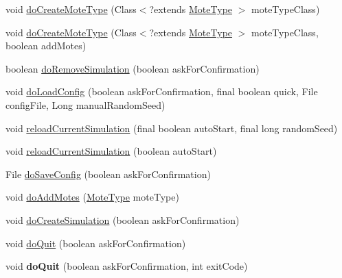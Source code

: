 \begin{DoxyCompactItemize}
\item 
void \hyperlink{classorg_1_1contikios_1_1cooja_1_1Cooja_ad4852cfd6527e8e6abeb411f80032670}{do\-Create\-Mote\-Type} (Class$<$?extends \hyperlink{interfaceorg_1_1contikios_1_1cooja_1_1MoteType}{Mote\-Type} $>$ mote\-Type\-Class)
\item 
void \hyperlink{classorg_1_1contikios_1_1cooja_1_1Cooja_a1b9fc81beb44e643bed511a3bee541dd}{do\-Create\-Mote\-Type} (Class$<$?extends \hyperlink{interfaceorg_1_1contikios_1_1cooja_1_1MoteType}{Mote\-Type} $>$ mote\-Type\-Class, boolean add\-Motes)
\item 
boolean \hyperlink{classorg_1_1contikios_1_1cooja_1_1Cooja_a0b4e1f7e5a943baf9db5da0ccdca0493}{do\-Remove\-Simulation} (boolean ask\-For\-Confirmation)
\item 
void \hyperlink{classorg_1_1contikios_1_1cooja_1_1Cooja_a767dee33228ee6f1ef657b7afd832962}{do\-Load\-Config} (boolean ask\-For\-Confirmation, final boolean quick, File config\-File, Long manual\-Random\-Seed)
\item 
void \hyperlink{classorg_1_1contikios_1_1cooja_1_1Cooja_a61dd083fd9c8bfa0e06c4195fd6210e3}{reload\-Current\-Simulation} (final boolean auto\-Start, final long random\-Seed)
\item 
void \hyperlink{classorg_1_1contikios_1_1cooja_1_1Cooja_a93a8d5a584d9c69e10a07186bdc3f8de}{reload\-Current\-Simulation} (boolean auto\-Start)
\item 
File \hyperlink{classorg_1_1contikios_1_1cooja_1_1Cooja_aa870229cbaa13c431c6af992c27c67af}{do\-Save\-Config} (boolean ask\-For\-Confirmation)
\item 
void \hyperlink{classorg_1_1contikios_1_1cooja_1_1Cooja_a38fbde11ae2a5aad1731b2a3b9d908e5}{do\-Add\-Motes} (\hyperlink{interfaceorg_1_1contikios_1_1cooja_1_1MoteType}{Mote\-Type} mote\-Type)
\item 
void \hyperlink{classorg_1_1contikios_1_1cooja_1_1Cooja_ac4a6eb024ed2dc395408b4c68b38b8d8}{do\-Create\-Simulation} (boolean ask\-For\-Confirmation)
\item 
void \hyperlink{classorg_1_1contikios_1_1cooja_1_1Cooja_a67da2cf4e939c9243c6f75dee9a639d1}{do\-Quit} (boolean ask\-For\-Confirmation)
\item 
\hypertarget{classorg_1_1contikios_1_1cooja_1_1Cooja_a3de49ceeb26740628702f2536e38d5f0}{void {\bfseries do\-Quit} (boolean ask\-For\-Confirmation, int exit\-Code)}\label{classorg_1_1contikios_1_1cooja_1_1Cooja_a3de49ceeb26740628702f2536e38d5f0}


\end{DoxyCompactItemize}

